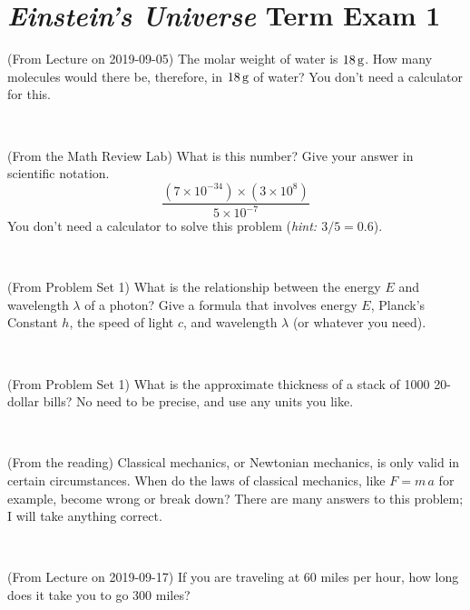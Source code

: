 \documentclass[12pt, letterpaper]{article}
\begin{document}
\section*{\textsl{Einstein's Universe} Term Exam 1}
\setcounter{problem}{1}


\begin{problem} (From Lecture on 2019-09-05)
The molar weight of water is $18\,\mathrm{g}$. How many molecules would there
be, therefore, in $18\,\mathrm{g}$ of water? You don't need a calculator for
this.
\end{problem}


\vfill ~

\begin{problem} (From the Math Review Lab)
What is this number? Give your answer in scientific notation.
$$
\frac{(7\times10^{-34})\times(3\times10^8)}{5\times10^{-7}}
$$
You don't need a calculator to solve this problem (\textit{hint: $3/5=0.6$}).
\end{problem}


\vfill ~

\begin{problem} (From Problem Set 1)
What is the relationship between the energy $E$ and wavelength
$\lambda$ of a photon? Give a formula that involves energy $E$,
Planck's Constant $h$, the speed of light $c$, and wavelength
$\lambda$ (or whatever you need).
\end{problem}

\vfill ~

\begin{problem} (From Problem Set 1)
What is the approximate thickness of a stack of 1000 20-dollar bills?
No need to be precise, and use any units you like.
\end{problem}


\vfill ~


\clearpage


\begin{problem} (From the reading)
Classical mechanics, or Newtonian mechanics, is only valid in certain
circumstances. When do the laws of classical mechanics, like $F =
m\,a$ for example, become wrong or break down? There are many answers
to this problem; I will take anything correct.
\end{problem}


\vfill ~

\begin{problem} (From Lecture on 2019-09-17)
If you are traveling at 60 miles per hour, how long does
it take you to go 300 miles?
\end{problem}
\end{document}

